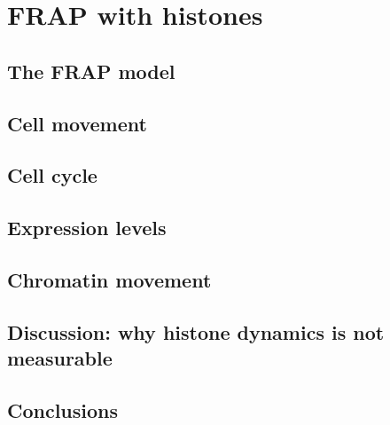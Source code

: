 \chapter{FRAP with histones}
\label{ch:frap}

\section{The FRAP model}
\section{Cell movement}
\section{Cell cycle}
\section{Expression levels}
\section{Chromatin movement}
\section{Discussion: why histone dynamics is not measurable}
\section{Conclusions}

